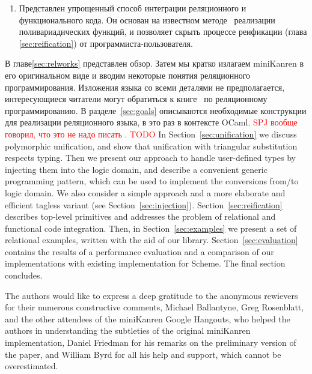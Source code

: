 \begin{enumerate}
\item Представлен упрощенный способ интеграции реляционного и функционального кода.
Он основан на известном методе~\cite{Unparsing, DoWeNeed}  реализации поливариадических функций, и позволяет скрыть процессе реификации (глава \ref{sec:reification}) от программиста-пользователя.
\end{enumerate}

В главе\ref{sec:relworks} представлен обзор.
Затем мы кратко излагаем miniKanren в его оригинальном виде и вводим некоторые понятия реляционного программирования. Изложения языка со всеми деталями не предполагается, интересующиеся читатели могут обратиться к книге~\cite{TRS} по реляционному программированию.
В разделе~\ref{sec:goals} описываются необходимые конструкции для реализации реляционного языка, в это раз в контексте OCaml.
\textcolor{red}{SPJ вообще говорил, что это не надо писать . TODO}
In Section~\ref{sec:unification} we discuss polymorphic unification, and show that unification with
triangular substitution respects typing. Then we present our approach to handle user-defined types by injecting them
into the logic domain, and describe a convenient generic programming pattern, which can be used to implement the conversions from/to logic
domain. We also consider a simple approach and a more elaborate and efficient tagless variant (see Section~\ref{sec:injection}).
Section~\ref{sec:reification} describes top-level primitives and addresses the problem of relational and functional code integration.
Then, in Section~\ref{sec:examples} we present a set of relational examples, written with the aid of our
library. Section~\ref{sec:evaluation} contains the results of a performance evaluation and a comparison of our implementations
with existing implementation for Scheme. The final section concludes.

The authors would like to express a deep gratitude to the anonymous rewievers for their numerous constructive comments, Michael Ballantyne, Greg Rosenblatt,
and the other attendees of the miniKanren Google Hangouts, who helped the authors in understanding the subtleties of the original miniKanren
implementation, Daniel Friedman for his remarks on the preliminary version of the paper, and William Byrd for all his help and support, which cannot be
overestimated.

